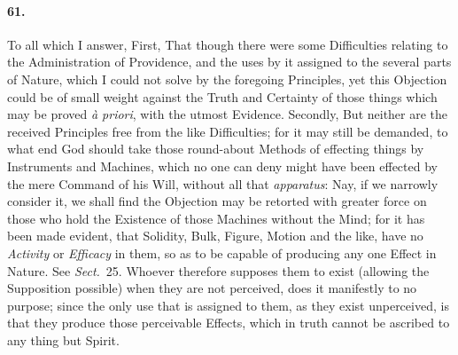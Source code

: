 \documentclass[]{article}
\newenvironment{sectionbody}{\begin{multicols}{2}}{\end{multicols}}
\begin{document}
\begin{sectionbody}
\paragraph{61.} To all which I answer, First, That though there were some
Difficulties relating to the Administration of Providence, and
the uses by it assigned to the several parts of Nature, which I
could not solve by the foregoing Principles, yet this Objection
could be of small weight against the Truth and Certainty of those
things which may be proved \emph{\`{a} priori}, with the
utmost Evidence.  Secondly, But neither are the received
Principles free from the like Difficulties; for it may still be
demanded, to what end God should take those round-about Methods
of effecting things by Instruments and Machines, which no one can
deny might have been effected by the mere Command of his Will,
without all that \emph{apparatus}: Nay, if we narrowly consider
it, we shall find the Objection may be retorted with greater
force on those who hold the Existence of those Machines without
the Mind; for it has been made evident, that Solidity, Bulk,
Figure, Motion and the like, have no \emph{Activity} or
\emph{Efficacy} in them, so as to be capable of producing any
one Effect in Nature.  See \emph{Sect.}~25.
Whoever therefore supposes them to exist (allowing the
Supposition possible) when they are not perceived, does it
manifestly to no purpose; since the only use that is assigned to
them, as they exist unperceived, is that they produce those
perceivable Effects, which in truth cannot be ascribed to any
thing but Spirit.




\end{sectionbody}
\end{document}
